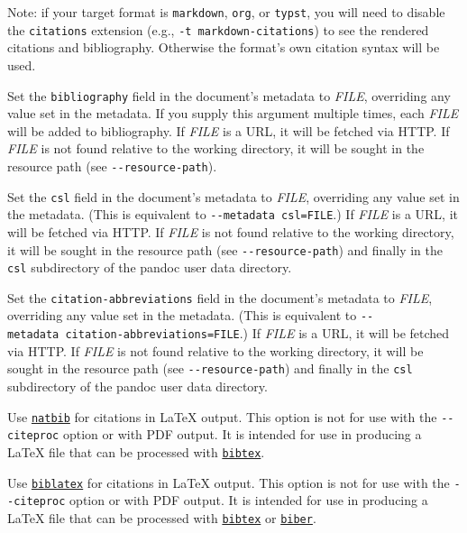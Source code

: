 \documentclass[
  b5paper
]{book}
\begin{document}
\begin{description}
Note: if your target format is \texttt{markdown}, \texttt{org}, or
\texttt{typst}, you will need to disable the \texttt{citations}
extension (e.g., \texttt{-t\ markdown-citations}) to see the rendered
citations and bibliography. Otherwise the format's own citation syntax
will be used.
\item[\texttt{-\/-bibliography=}\emph{FILE}]
Set the \texttt{bibliography} field in the document's metadata to
\emph{FILE}, overriding any value set in the metadata. If you supply
this argument multiple times, each \emph{FILE} will be added to
bibliography. If \emph{FILE} is a URL, it will be fetched via HTTP. If
\emph{FILE} is not found relative to the working directory, it will be
sought in the resource path (see \texttt{-\/-resource-path}).
\item[\texttt{-\/-csl=}\emph{FILE}]
Set the \texttt{csl} field in the document's metadata to \emph{FILE},
overriding any value set in the metadata. (This is equivalent to
\texttt{-\/-metadata\ csl=FILE}.) If \emph{FILE} is a URL, it will be
fetched via HTTP. If \emph{FILE} is not found relative to the working
directory, it will be sought in the resource path (see
\texttt{-\/-resource-path}) and finally in the \texttt{csl} subdirectory
of the pandoc user data directory.
\item[\texttt{-\/-citation-abbreviations=}\emph{FILE}]
Set the \texttt{citation-abbreviations} field in the document's metadata
to \emph{FILE}, overriding any value set in the metadata. (This is
equivalent to \texttt{-\/-metadata\ citation-abbreviations=FILE}.) If
\emph{FILE} is a URL, it will be fetched via HTTP. If \emph{FILE} is not
found relative to the working directory, it will be sought in the
resource path (see \texttt{-\/-resource-path}) and finally in the
\texttt{csl} subdirectory of the pandoc user data directory.
\item[\texttt{-\/-natbib}]
Use \href{https://ctan.org/pkg/natbib}{\texttt{natbib}} for citations in
LaTeX output. This option is not for use with the \texttt{-\/-citeproc}
option or with PDF output. It is intended for use in producing a LaTeX
file that can be processed with
\href{https://ctan.org/pkg/bibtex}{\texttt{bibtex}}.
\item[\texttt{-\/-biblatex}]
Use \href{https://ctan.org/pkg/biblatex}{\texttt{biblatex}} for
citations in LaTeX output. This option is not for use with the
\texttt{-\/-citeproc} option or with PDF output. It is intended for use
in producing a LaTeX file that can be processed with
\href{https://ctan.org/pkg/bibtex}{\texttt{bibtex}} or
\href{https://ctan.org/pkg/biber}{\texttt{biber}}.
\end{description}
\end{document}
